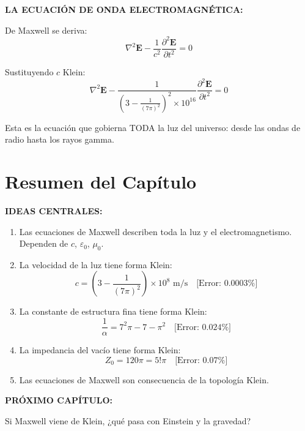 \textbf{LA ECUACIÓN DE ONDA ELECTROMAGNÉTICA:}

De Maxwell se deriva:
\begin{equation}
\nabla^2 \mathbf{E} - \frac{1}{c^2} \frac{\partial^2 \mathbf{E}}{\partial t^2} = 0
\end{equation}

Sustituyendo $c$ Klein:
\begin{equation}
\nabla^2 \mathbf{E} - \frac{1}{\left(3 - \frac{1}{(7\pi)^2}\right)^2 \times 10^{16}} \frac{\partial^2 \mathbf{E}}{\partial t^2} = 0
\end{equation}

Esta es la ecuación que gobierna TODA la luz del universo:
desde las ondas de radio hasta los rayos gamma.


\section{Resumen del Capítulo}

\begin{tcolorbox}[colback=kleingray, colframe=kleinblue, title=\textbf{Resumen del Capítulo 3}]

\textbf{IDEAS CENTRALES:}

\begin{enumerate}
    \item Las ecuaciones de Maxwell describen toda la luz y el
    electromagnetismo. Dependen de $c$, $\varepsilon_0$, $\mu_0$.

    \item La velocidad de la luz tiene forma Klein:
    \begin{equation}
    c = \left(3 - \frac{1}{(7\pi)^2}\right) \times 10^8 \text{ m/s} \quad \text{[Error: 0.0003\%]}
    \end{equation}

    \item La constante de estructura fina tiene forma Klein:
    \begin{equation}
    \frac{1}{\alpha} = 7^2\pi - 7 - \pi^2 \quad \text{[Error: 0.024\%]}
    \end{equation}

    \item La impedancia del vacío tiene forma Klein:
    \begin{equation}
    Z_0 = 120\pi = 5!\pi \quad \text{[Error: 0.07\%]}
    \end{equation}

    \item Las ecuaciones de Maxwell son consecuencia de la topología Klein.
\end{enumerate}

\vspace{0.3cm}
\textbf{PRÓXIMO CAPÍTULO:}

Si Maxwell viene de Klein, ¿qué pasa con Einstein y la gravedad?

\end{tcolorbox}


